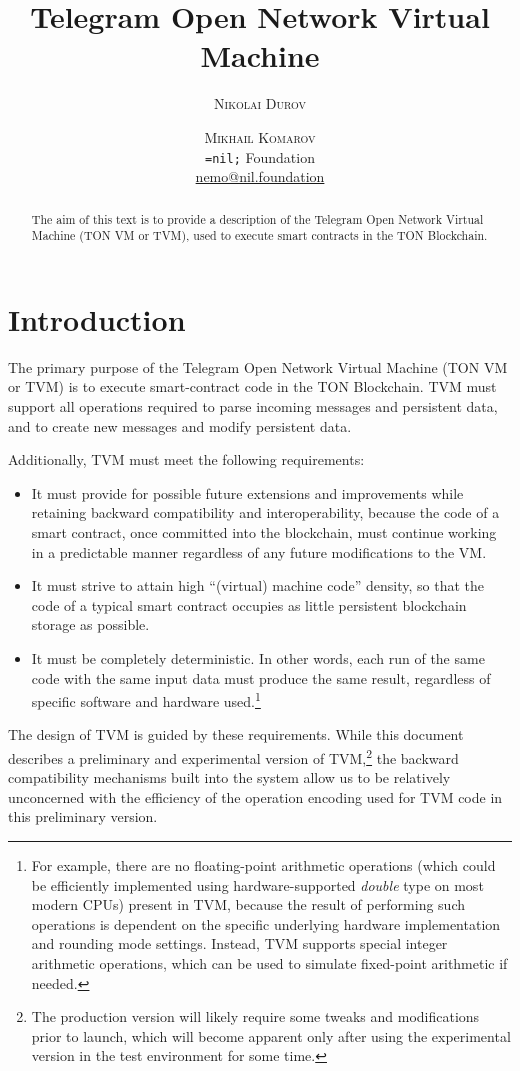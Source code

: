 \documentclass[12pt,oneside]{article}
\title{Telegram Open Network Virtual Machine}
\author{
    \textsc{Nikolai Durov} \\[1ex] %
    \and
    \textsc{Mikhail Komarov} \\[1ex] %
    \normalsize \texttt{=nil;} Foundation \\ %
    \normalsize \href{mailto:nemo@nil.foundation}{nemo@nil.foundation} %
}
\def\markbothsame#1{\fancyhead[C]{#1}}
\begin{document}
    \maketitle

    \begin{abstract}
        The aim of this text is to provide a description of the Telegram
        Open Network Virtual Machine (TON VM or TVM), used to execute smart
        contracts in the TON Blockchain.
    \end{abstract}

    \section*{Introduction}
    \markbothsame{Introduction}

    The primary purpose of the Telegram Open Network Virtual Machine (TON VM or TVM) is to execute smart-contract code in the TON Blockchain. TVM must support all operations required to parse incoming messages and persistent data, and to create new messages and modify persistent data.

    Additionally, TVM must meet the following requirements:
    \begin{itemize}
        \item It must provide for possible future extensions and improvements while retaining backward compatibility and interoperability, because the code of a smart contract, once committed into the blockchain, must continue working in a predictable manner regardless of any future modifications to the VM.
        \item It must strive to attain high ``(virtual) machine code'' density, so that the code of a typical smart contract occupies as little persistent block\-chain storage as possible.
        \item It must be completely deterministic. In other words, each run of the same code with the same input data must produce the same result, regardless of specific software and hardware used.\footnote{For example, there are no floating-point arithmetic operations (which could be efficiently implemented using hardware-supported {\em double\/} type on most modern CPUs) present in TVM, because the result of performing such operations is dependent on the specific underlying hardware implementation and rounding mode settings. Instead, TVM supports special integer arithmetic operations, which can be used to simulate fixed-point arithmetic if needed.}
    \end{itemize}
    The design of TVM is guided by these requirements. While this document describes a preliminary and experimental version of TVM,\footnote{The production version will likely require some tweaks and modifications prior to launch, which will become apparent only after using the experimental version in the test environment for some time.} the backward compatibility mechanisms built into the system allow us to be relatively unconcerned with the efficiency of the operation encoding used for TVM code in this preliminary version.
\end{document}
